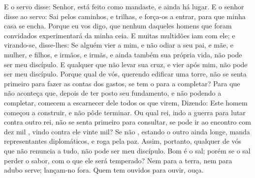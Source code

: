 {  E o servo disse: Senhor, está feito como mandaste, e ainda há lugar.
  E o senhor disse ao servo: Sai pelos caminhos, e trilhas, e força-os a entrar, para que minha casa se encha.
  Porque eu vos digo, que nenhum daqueles homens que foram convidados experimentará da minha ceia.
  E muitas multidões iam com ele; e virando-se, disse-lhes:
  Se alguém vier a mim, e não odiar a seu pai, e mãe, e mulher, e filhos, e irmãos, e irmãs, e ainda também sua própria vida, não pode ser meu discípulo.
  E qualquer que não levar sua cruz, e vier após mim, não pode ser meu discípulo.
  Porque qual de vós, querendo edificar uma torre, não se senta primeiro para fazer as contas dos gastos,
{} se tem o
{} para a completar?
  Para que não aconteça que, depois de ter posto seu fundamento, e não podendo a completar, comecem a escarnecer dele todos os que
{} virem,
  Dizendo: Este homem começou a construir, e não pôde terminar.
  Ou qual rei, indo a guerra para lutar contra outro rei, não se senta primeiro para consultar, se pode ir ao encontro com dez mil
{},  vindo contra ele vinte mil?
  Se não
{},  estando o outro ainda longe, manda
{} representantes diplomáticos, e roga pela paz.
  Assim, portanto, qualquer de vós que não renuncia a tudo, não pode ser meu discípulo.
  Bom é o sal; porém se o sal perder o sabor, com o que ele será temperado?
  Nem para a terra, nem para adubo serve; lançam-no fora. Quem tem ouvidos para ouvir, ouça.
\par }

